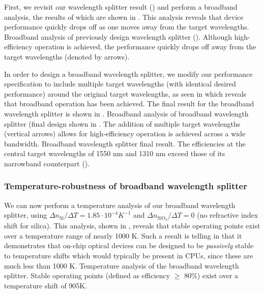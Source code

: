 \documentclass[letterpaper,10pt]{article}
\begin{document}
First, we revisit our wavelength splitter result ()
    and perform a broadband analysis, 
    the results of which are shown in .
This analysis reveals that device performance quickly drops off
    as one moves away from the target wavelengths.
    {Broadband analysis of previously design wavelength splitter ().
    Although high-efficiency operation is achieved, 
    the performance quickly drops off away from the target wavelengths 
    (denoted by arrows).}

In order to design a broadband wavelength splitter,
    we modify our performance specification to include multiple target 
    wavelengths (with identical desired performance) around the 
    original target wavelengths, as seen in 
    which reveals that broadband operation has been achieved.
The final result for the broadband wavelength splitter is shown in .
    {Broadband analysis of broadband wavelength splitter 
        (final design shown in .
    The addition of multiple target wavelengths (vertical arrows)
    allows for 
    high-efficiency operation is achieved across a wide bandwidth.}
    {Broadband wavelength splitter final result.
    The efficiencies at the central target wavelengths of 1550 nm and 1310 nm
    exceed those of its narrowband counterpart ().}

\subsubsection{Temperature-robustness of broadband wavelength splitter}
We can now perform a temperature analysis of our broadband wavelength splitter,
    using $\Delta n_\text{Si} / \Delta T = 1.85 \cdot 10^{-4} K^{-1}$ 
    and $\Delta n_{\text{SiO}_2} / \Delta T = 0$ 
    (no refractive index shift for silica).
This analysis, shown in ,
    reveals that stable operating points exist
    over a temperature range of nearly 1000 K.
Such a result is telling in that it demonstrates
    that on-chip optical devices can be designed to be \emph{passively} stable
    to temperature shifts which would typically be present in CPUs,
    since these are much less than 1000 K.
    {Temperature analysis of the broadband wavelength splitter.
    Stable operating points (defined as efficiency $\ge$ 80\%)
    exist over a temperature shift of 905K.}
\end{document}
